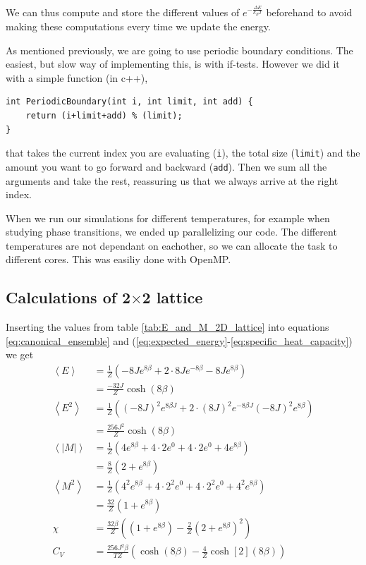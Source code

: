 \documentclass[reprint, english,notitlepage,nofootinbib]{revtex4-1}  %
\begin{document}
We can thus compute and store the different values of $e^{- \frac{\Delta E}{k_BT}}$ beforehand to avoid making these computations every time we update the energy.

As mentioned previously, we are going to use periodic boundary conditions. The easiest, but slow way of implementing this, is with if-tests. However we did it with a simple function (in c++),
\begin{lstlisting}
int PeriodicBoundary(int i, int limit, int add) {
	return (i+limit+add) % (limit);
}
\end{lstlisting}
that takes the current index you are evaluating (\texttt{i}), the total size (\texttt{limit}) and the amount you want to go forward and backward (\texttt{add}). Then we sum all the arguments and take the rest, reassuring us that we always arrive at the right index.

When we run our simulations for different temperatures, for example when studying phase transitions, we ended up parallelizing our code. The different temperatures are not dependant on eachother, so we can allocate the task to different cores. This was easiliy done with OpenMP.

\subsection{Calculations of 2$\times$2 lattice} \label{calc_of_22_lattice}

Inserting the values from table \ref{tab:E_and_M_2D_lattice} into equations \eqref{eq:canonical_ensemble} and (\ref{eq:expected_energy}-\ref{eq:specific_heat_capacity}) we get
\begin{align*}
	\left<E\right> &= \frac{1}{Z}\left(-8Je^{8\beta} + 2\cdot 8Je^{-8\beta } - 8J e^{8\beta }\right) \\
	&= \frac{-32J}{Z}\cosh(8\beta )\\
	\left<E^2\right> &= \frac{1}{Z}\left((-8J)^2e^{8\beta J} + 2\cdot (8J)^2e^{-8\beta J} (- 8J)^2 e^{8\beta }\right) \\
	&= \frac{256J^2}{Z}\cosh(8\beta)\\
	\left<|M|\right> &= \frac{1}{Z}\left(4e^{8\beta } + 4\cdot 2e^{0} + 4\cdot 2 e^{0} + 4e^{8\beta }\right) \\
	&= \frac{8}{Z}\left(2 + e^{8\beta }\right)\\
	\left<M^2\right> &= \frac{1}{Z}\left(4^2e^{8\beta } + 4\cdot 2^2e^{0} + 4\cdot 2^2 e^{0} + 4^2e^{8\beta }\right) \\
	&= \frac{32}{Z}\left(1 + e^{8\beta }\right)\\
	\chi &= \frac{32\beta}{Z}\left(\left(1 + e^{8\beta }\right) - \frac{2}{Z}\left(2 + e^{8\beta }\right)^2 \right)\\
	C_V &= \frac{256J^2\beta}{TZ}\left(\cosh(8\beta) - \frac{4}{Z}\cosh[2](8\beta)\right)
\end{align*}
\end{document}
